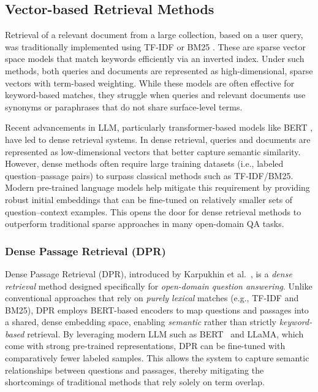 \subsection{Vector-based Retrieval Methods}

Retrieval of a relevant document from a large collection, based on a user query, was traditionally implemented using TF-IDF or BM25 \cite{bm25}. These are sparse vector space models that match keywords efficiently via an inverted index. Under such methods, both queries and documents are represented as high-dimensional, sparse vectors with term-based weighting. While these models are often effective for keyword-based matches, they struggle when queries and relevant documents use synonyms or paraphrases that do not share surface-level terms.

Recent advancements in \gls{LLM}, particularly transformer-based models like BERT \cite{bertpretrainingdeepbidirectional}, have led to dense retrieval systems. In dense retrieval, queries and documents are represented as low-dimensional vectors that better capture semantic similarity. However, dense methods often require large training datasets (i.e., labeled question–passage pairs) to surpass classical methods such as TF-IDF/BM25. Modern pre-trained language models help mitigate this requirement by providing robust initial embeddings that can be fine-tuned on relatively smaller sets of question–context examples. This opens the door for dense retrieval methods to outperform traditional sparse approaches in many open-domain QA tasks.
\subsubsection{Dense Passage Retrieval (DPR)}
\label{par:dpr}
Dense Passage Retrieval (DPR), introduced by Karpukhin et al.~\cite{densepassageretrievalopendomainkarpukhin2020}, is a \textit{dense retrieval} method designed specifically for \textit{open-domain question answering}. Unlike conventional approaches that rely on \textit{purely lexical} matches (e.g., TF-IDF and BM25), DPR employs BERT-based encoders to map questions and passages into a shared, dense embedding space, enabling \textit{semantic} rather than strictly \textit{keyword-based} retrieval. By leveraging modern \gls{LLM} such as BERT~\cite{bertpretrainingdeepbidirectional} and LLaMA, which come with strong pre-trained representations, DPR can be fine-tuned with comparatively fewer labeled samples. This allows the system to capture semantic relationships between questions and passages, thereby mitigating the shortcomings of traditional methods that rely solely on term overlap.

